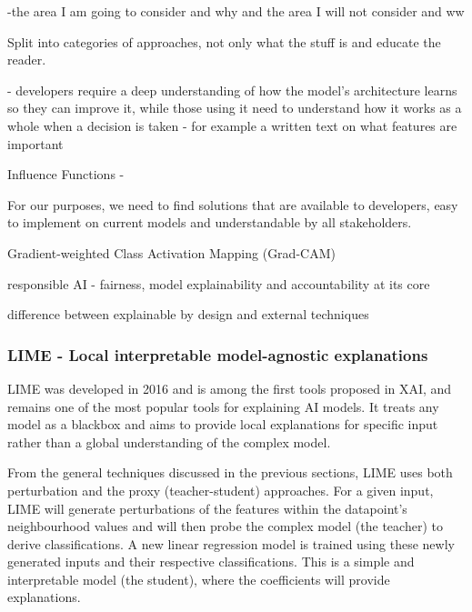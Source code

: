 \documentclass[proposal]{softeng}
\begin{document}
-the area I am going to consider and why and the area I will not consider and ww


Split into categories of approaches, not only what the stuff is and educate the reader.

- developers require a deep understanding of how the model's architecture learns so they can improve it, while those using it need to understand how it works as a whole when a decision is taken - for example a written text on what features are important

Influence Functions -




For our purposes, we need to find solutions that are available to developers, easy to implement on current models and understandable by all stakeholders.


Gradient-weighted Class Activation Mapping (Grad-CAM)

responsible AI - fairness, model explainability and accountability at its core

difference between explainable by design and external techniques
\subsubsection{LIME - Local interpretable model-agnostic explanations}
LIME\cite{RibeiroMarcoTulio2016WSIT} was developed in 2016 and is among the first tools proposed in XAI, and remains one of the most popular tools for explaining AI models. It treats any model as a blackbox and aims to provide local explanations for specific input rather than a global understanding of the complex model.

From the general techniques discussed in the previous sections, LIME uses both perturbation and the proxy (teacher-student) approaches. For a given input, LIME will generate perturbations of the features within the datapoint's neighbourhood values and will then probe the complex model (the teacher) to derive classifications. A new linear regression model is trained using these newly generated inputs and their respective classifications. This is a simple and interpretable model (the student), where the coefficients will provide explanations.
\end{document}
